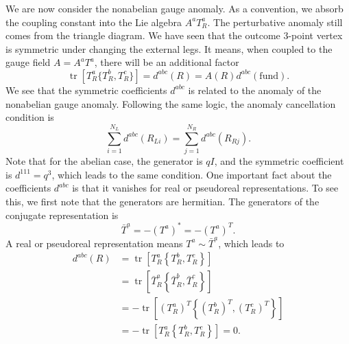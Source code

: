 \documentclass[aps,prb,superscriptaddress,nofootinbib]{revtex4}
\def \tr{\operatorname{tr}}
\begin{document}
We are now consider the nonabelian gauge anomaly.
As a convention, we absorb the coupling constant into the Lie algebra $A^a T^a_R$.
The perturbative anomaly still comes from the triangle diagram.
We have seen that the outcome 3-point vertex is symmetric under changing the external legs.
It means, when coupled to the gauge field $A = A^a T^a$, there will be an additional factor
\begin{equation}
	\tr\left[T_R^a \{T_R^b, T_R^c\}\right] = d^{abc}(R) = A(R) d^{abc}(\text{fund}).
\end{equation}
We see that the symmetric coefficients $d^{abc}$ is related to the anomaly of the nonabelian gauge anomaly.
Following the same logic, the anomaly cancellation condition is
\begin{equation}
	\sum_{i=1}^{N_L} d^{abc}(R_{Li}) = \sum_{j=1}^{N_R} d^{abc}(R_{Rj}).
\end{equation}
Note that for the abelian case, the generator is $qI$, and the symmetric coefficient is $d^{111} = q^3$, which leads to the same condition.
One important fact about the coefficients $d^{abc}$ is that it vanishes for real or pseudoreal representations.
To see this, we first note that the generators are hermitian.
The generators of the conjugate representation is
\begin{equation}
	\bar T^a = - (T^{a})^* = - (T^{a})^T.
\end{equation}
A real or pseudoreal representation means $T^a \sim \bar T^a$, which leads to
\begin{equation}
\begin{aligned}
	d^{abc}(R) 
	&= \tr\left[T^a_R \left\{T^b_R, T^c_R \right\} \right] \\
	&= \tr\left[\bar T_R^a \left\{\bar T_R^b, \bar T_R^c \right\} \right] \\
	&= -\tr\left[(T_R^a)^T \left\{(T_R^b)^T,(T_R^c)^T \right\} \right] \\
	&= -\tr\left[T_R^a \left\{T_R^b,T_R^c \right\} \right] = 0.
\end{aligned}
\end{equation}
\end{document}
